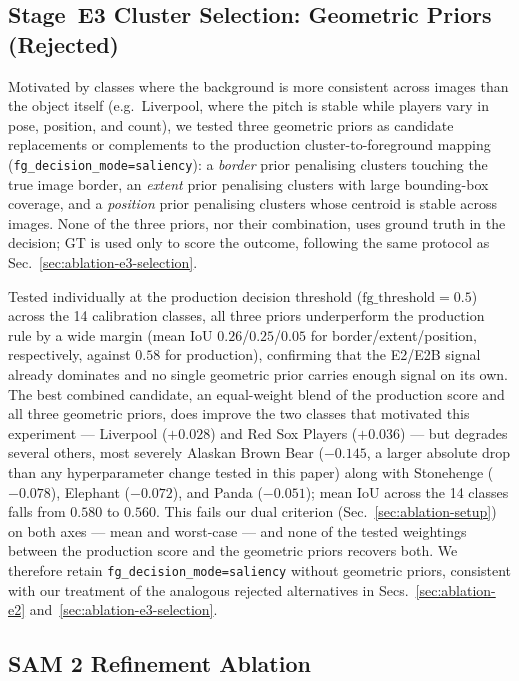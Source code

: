 \subsection{Stage~E3 Cluster Selection: Geometric Priors (Rejected)}
\label{sec:ablation-e3-geoprior}

Motivated by classes where the background is more consistent across images
than the object itself (e.g.\ Liverpool, where the pitch is stable while
players vary in pose, position, and count), we tested three geometric
priors as candidate replacements or complements to the production
cluster-to-foreground mapping (\texttt{fg\_decision\_mode=saliency}):
a \emph{border} prior penalising clusters touching the true image border,
an \emph{extent} prior penalising clusters with large bounding-box
coverage, and a \emph{position} prior penalising clusters whose centroid
is stable across images. None of the three priors, nor their combination,
uses ground truth in the decision; GT is used only to score the outcome,
following the same protocol as
Sec.~\ref{sec:ablation-e3-selection}.

Tested individually at the production decision threshold
($\text{fg\_threshold}=0.5$) across the 14 calibration classes, all three
priors underperform the production rule by a wide margin (mean IoU
$0.26$/$0.25$/$0.05$ for border/extent/position, respectively, against
$0.58$ for production), confirming that the E2/E2B signal already
dominates and no single geometric prior carries enough signal on its own.
The best combined candidate, an equal-weight blend of the production score
and all three geometric priors, does improve the two classes that
motivated this experiment --- Liverpool ($+0.028$) and Red Sox Players
($+0.036$) --- but degrades several others, most severely Alaskan Brown
Bear ($-0.145$, a larger absolute drop than any hyperparameter change
tested in this paper) along with Stonehenge ($-0.078$), Elephant
($-0.072$), and Panda ($-0.051$); mean IoU across the 14 classes falls
from $0.580$ to $0.560$. This fails our dual criterion
(Sec.~\ref{sec:ablation-setup}) on both axes --- mean and worst-case --- and
none of the tested weightings between the production score and the
geometric priors recovers both. We therefore retain
\texttt{fg\_decision\_mode=saliency} without geometric priors, consistent
with our treatment of the analogous rejected alternatives in
Secs.~\ref{sec:ablation-e2} and~\ref{sec:ablation-e3-selection}.

\subsection{SAM 2 Refinement Ablation}
\label{sec:ablation-e4}


